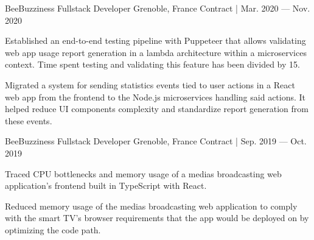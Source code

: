 

\begin{cventries}
    \cventry
    {BeeBuzziness} %
    {Fullstack Developer} %
    {Grenoble, France} %
    {Contract | Mar. 2020 — Nov. 2020} %
    {
    \begin{cvitems} %
        \item {Established an end-to-end testing pipeline with Puppeteer that allows validating web app usage report generation in a lambda architecture within a microservices context.
        Time spent testing and validating this feature has been divided by 15.}
        \item {Migrated a system for sending statistics events tied to user actions in a React web app from the frontend to the Node.js microservices handling said actions.
        It helped reduce UI components complexity and standardize report generation from these events.}
    \end{cvitems}
    }

    \cventry
    {BeeBuzziness} %
    {Fullstack Developer} %
    {Grenoble, France} %
    {Contract | Sep. 2019 — Oct. 2019} %
    {
    \begin{cvitems} %
        \item {Traced CPU bottlenecks and memory usage of a medias broadcasting web application's frontend built in TypeScript with React.}
        \item {Reduced memory usage of the medias broadcasting web application to comply with the smart TV's browser requirements that the app would be deployed on by optimizing the code path.}
    \end{cvitems}
    }


\end{cventries}

